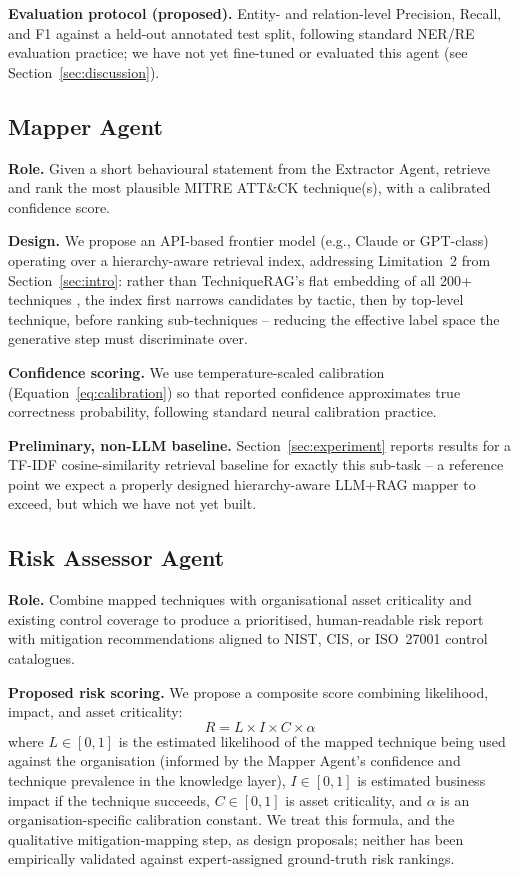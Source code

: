 \documentclass[runningheads]{llncs}
\begin{document}
\textbf{Evaluation protocol (proposed).} Entity- and relation-level Precision, Recall, and F1 against a held-out annotated test split, following standard NER/RE evaluation practice; we have not yet fine-tuned or evaluated this agent (see Section~\ref{sec:discussion}).

\subsection{Mapper Agent}
\label{sec:mapper}

\textbf{Role.} Given a short behavioural statement from the Extractor Agent, retrieve and rank the most plausible MITRE ATT\&CK technique(s), with a calibrated confidence score.

\textbf{Design.} We propose an API-based frontier model (e.g., Claude or GPT-class) operating over a hierarchy-aware retrieval index, addressing Limitation~2 from Section~\ref{sec:intro}: rather than TechniqueRAG's flat embedding of all 200+ techniques \cite{hierrag2026}, the index first narrows candidates by tactic, then by top-level technique, before ranking sub-techniques -- reducing the effective label space the generative step must discriminate over.

\textbf{Confidence scoring.} We use temperature-scaled calibration (Equation~\ref{eq:calibration}) so that reported confidence approximates true correctness probability, following standard neural calibration practice.

\textbf{Preliminary, non-LLM baseline.} Section~\ref{sec:experiment} reports results for a TF-IDF cosine-similarity retrieval baseline for exactly this sub-task -- a reference point we expect a properly designed hierarchy-aware LLM+RAG mapper to exceed, but which we have not yet built.

\subsection{Risk Assessor Agent}

\textbf{Role.} Combine mapped techniques with organisational asset criticality and existing control coverage to produce a prioritised, human-readable risk report with mitigation recommendations aligned to NIST, CIS, or ISO~27001 control catalogues.

\textbf{Proposed risk scoring.} We propose a composite score combining likelihood, impact, and asset criticality:
\begin{equation}
R = L \times I \times C \times \alpha
\label{eq:risk}
\end{equation}
where $L \in [0,1]$ is the estimated likelihood of the mapped technique being used against the organisation (informed by the Mapper Agent's confidence and technique prevalence in the knowledge layer), $I \in [0,1]$ is estimated business impact if the technique succeeds, $C \in [0,1]$ is asset criticality, and $\alpha$ is an organisation-specific calibration constant. We treat this formula, and the qualitative mitigation-mapping step, as design proposals; neither has been empirically validated against expert-assigned ground-truth risk rankings.
\end{document}
